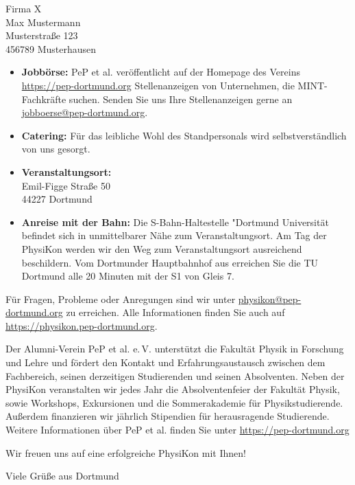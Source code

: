 \documentclass[
  pepbrief,
  fontsize=12pt,
  paper=a4,
  DIV=14,
  parskip=half,
  backaddress=false,
]{scrlttr2}
\begin{document}
\begin{letter}{%
  Firma X\\
  Max Mustermann\\
  Musterstraße 123\\
  456789 Musterhausen

}
\begin{itemize}
    \item \textbf{Jobbörse:} PeP et al. veröffentlicht auf der Homepage des Vereins \url{https://pep-dortmund.org} Stellenanzeigen von Unternehmen, die MINT-Fachkräfte suchen.
    Senden Sie uns Ihre Stellenanzeigen gerne an \href{mailto:jobboerse@pep-dortmund.org}{jobboerse@pep-dortmund.org}.
    \item \textbf{Catering:} Für das leibliche Wohl des Standpersonals wird selbstverständlich von uns gesorgt.
    \item \textbf{Veranstaltungsort:}
    \vspace{3mm}\\
    Emil-Figge Straße 50\\
    44227 Dortmund
    \item \textbf{Anreise mit der Bahn:} Die S-Bahn-Haltestelle "Dortmund Universität befindet sich in unmittelbarer Nähe zum Veranstaltungsort.
    Am Tag der PhysiKon werden wir den Weg zum Veranstaltungsort ausreichend beschildern.
    Vom Dortmunder Hauptbahnhof aus erreichen Sie die TU Dortmund alle 20 Minuten mit der S1 von Gleis 7.
\end{itemize}

Für Fragen, Probleme oder Anregungen sind wir unter \href{mailto:physikon@pep-dortmund.org}{physikon@pep-dortmund.org} zu erreichen.
Alle Informationen finden Sie auch auf \url{https://physikon.pep-dortmund.org}.

Der Alumni-Verein PeP et al. e.\,V. unterstützt die Fakultät Physik in Forschung und Lehre und fördert den Kontakt und Erfahrungsaustausch zwischen dem Fachbereich,
seinen derzeitigen Studierenden und seinen Absolventen. Neben der PhysiKon veranstalten wir jedes Jahr die Absolventenfeier der Fakultät Physik, sowie Workshops, Exkursionen
und die Sommerakademie für Physikstudierende. Außerdem finanzieren wir jährlich Stipendien für herausragende Studierende. Weitere Informationen über PeP et al. finden Sie unter
\url{https://pep-dortmund.org}

Wir freuen uns auf eine erfolgreiche PhysiKon mit Ihnen!

\closing{Viele Grüße aus Dortmund}

\end{letter}
\end{document}
